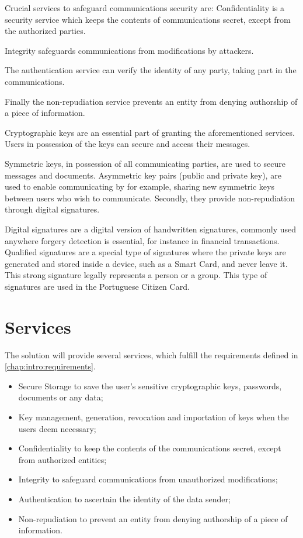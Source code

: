 Crucial services to safeguard communications security are:
Confidentiality is a security service which keeps the contents of communications secret, except from the authorized parties.

Integrity safeguards communications from modifications by attackers.

The authentication service can verify the identity of any party, taking part in the communications.

Finally the non-repudiation service prevents an entity from denying authorship of a piece of information.

Cryptographic keys are an essential part of granting the aforementioned services. Users in possession of the keys can secure and access their messages.

Symmetric keys, in possession of all communicating parties, are used to secure messages and documents.
Asymmetric key pairs (public and private key), are used to enable communicating by for example, sharing new symmetric keys between users who wish to communicate. Secondly, they provide non-repudiation through digital signatures.

Digital signatures are a digital version of handwritten signatures, commonly used anywhere forgery detection is essential, for instance in financial transactions.
Qualified signatures are a special type of signatures where the private keys are generated and stored inside a device, such as a Smart Card, and never leave it.
This strong signature legally represents a person or a group. This type of signatures are used in the Portuguese Citizen Card.

\section{Services} \label{chap:problem:services}


The solution will provide several services, which fulfill the requirements defined in \ref{chap:intro:requirements}.

\begin{itemize}
    \item Secure Storage to save the user's sensitive cryptographic keys, passwords, documents or any data;
    \item Key management, generation, revocation and importation of keys when the users deem necessary;
    \item Confidentiality to keep the contents of the communications secret, except from authorized entities;
    \item Integrity to safeguard communications from unauthorized modifications;
    \item Authentication to ascertain the identity of the data sender;
    \item Non-repudiation to prevent an entity from denying authorship of a piece of information.
\end{itemize}
